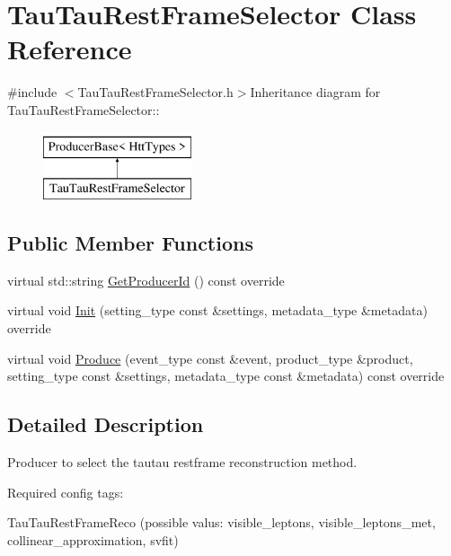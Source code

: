 \hypertarget{classTauTauRestFrameSelector}{
\section{TauTauRestFrameSelector Class Reference}
\label{classTauTauRestFrameSelector}
}


{\ttfamily \#include $<$TauTauRestFrameSelector.h$>$}Inheritance diagram for TauTauRestFrameSelector::\begin{figure}[H]
\begin{center}
\leavevmode
\includegraphics[height=2cm]{classTauTauRestFrameSelector}
\end{center}
\end{figure}
\subsection*{Public Member Functions}
\begin{DoxyCompactItemize}
\item 
virtual std::string \hyperlink{classTauTauRestFrameSelector_a045f49f73f38509dfba1652056a49955}{GetProducerId} () const override
\item 
virtual void \hyperlink{classTauTauRestFrameSelector_afb59f86a2071c144277a0209a79f5f4d}{Init} (setting\_\-type const \&settings, metadata\_\-type \&metadata) override
\item 
virtual void \hyperlink{classTauTauRestFrameSelector_a825068b05a9345eaffc8c34895142720}{Produce} (event\_\-type const \&event, product\_\-type \&product, setting\_\-type const \&settings, metadata\_\-type const \&metadata) const override
\end{DoxyCompactItemize}


\subsection{Detailed Description}
Producer to select the tautau restframe reconstruction method.

Required config tags:
\begin{DoxyItemize}
\item TauTauRestFrameReco (possible valus: visible\_\-leptons, visible\_\-leptons\_\-met, collinear\_\-approximation, svfit) 
\end{DoxyItemize}

